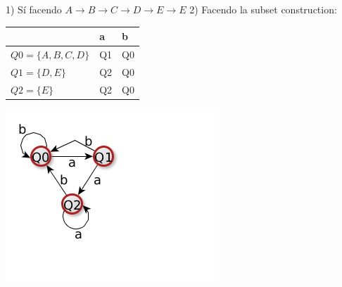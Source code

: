 1) S\'i facendo $A \rightarrow B \rightarrow C \rightarrow D \rightarrow E \rightarrow E $
2) Facendo la subset construction:

\begin{center}
    \begin{tabular}{|l|l|l|}
        \hline
                                &   a   &  b    \\
        \hline
            $Q0 = \{A,B,C,D\}$  &   Q1  &  Q0   \\
        \hline
            $Q1 = \{D,E\}$      &   Q2  &  Q0   \\
        \hline
           $Q2 = \{E\}$         &   Q2  &  Q0   \\
        \hline
    \end{tabular}
\end{center} 

\begin{center}
	\includegraphics[scale=0.6]{Chapters/Img/c03_01.png}\\
\end{center} 